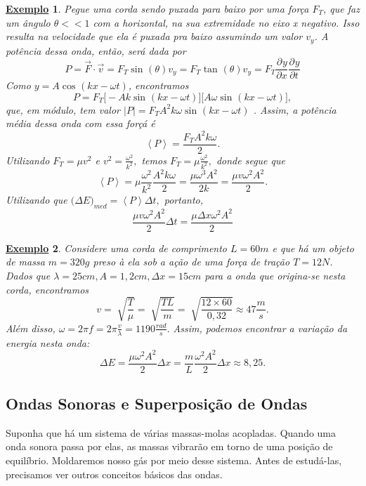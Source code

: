 \documentclass{article}
\newtheorem{example}{\underline{Exemplo}}
\begin{document}
\begin{example}
  Pegue uma corda sendo puxada para baixo por uma força \(F_{T}\), que faz um ângulo \(\theta << 1\) com a horizontal, na sua extremidade no eixo x negativo. Isso resulta
na velocidade que ela é puxada pra baixo assumindo um valor \(v_{y}\). A potência dessa onda, então, será dada por 
  \[
    P = \vec{F}\cdot \vec{v} = F_{T}\sin^{}{(\theta )}v_{y} = F_{T}\tan^{}{(\theta )}v_{y} = F_{T}\frac{\partial^{}y}{\partial x^{}}\frac{\partial^{}y}{\partial t^{}}
  \]
Como \(y = A\cos^{}{(kx - \omega t)}\), encontramos 
  \[
    P = F_{T}\biggl[-Ak\sin^{}{(kx - \omega t)}\biggr]\biggl[A\omega \sin^{}{(kx - \omega t)}\biggr],
  \]
que, em módulo, tem valor \(|P|=F_{T}A^{2}k\omega \sin^{}{(kx-\omega t)}\) . Assim, a potência média dessa onda com essa forçá é 
  \[
   \left< P \right> = \frac{F_{T}A^{2}k\omega }{2}.
  \]
  Utilizando \(F_{T} = \mu v^{2}\) e \(v^{2} = \frac{\omega ^{2}}{k^{2}},\) temos \(F_{T} = \mu \frac{\omega^{2}}{k^{2}},\) donde segue que
  \[
    \left< P \right> = \mu \frac{\omega^{2}}{k^{2}}\frac{A^{2}k\omega }{2} = \frac{\mu\omega^{3}A^{2}}{2k} = \frac{\mu v \omega^{2}A^{2}}{2}.
  \]
Utilizando que \(\biggl(\Delta E\biggr)_{med} = \left< P \right> \Delta t,\) portanto, 
  \[
    \frac{\mu v \omega ^{2}A^{2}}{2}\Delta t = \frac{\mu\Delta x\omega^{2}A^{2}}{2}
  \]
\end{example}
\begin{example}
  Considere uma corda de comprimento \(L = 60m\) e que há um objeto de massa \(m =320g\) preso à ela sob a ação de uma força de tração
 \(T = 12N\). Dados que \(\lambda = 25cm, A = 1,2cm, \Delta x = 15cm\) para a onda que origina-se nesta corda, encontramos 
   \[
     v = \sqrt[]{\frac{T}{\mu}} = \sqrt[]{\frac{TL}{m}} = \sqrt[]{\frac{12\times 60}{0,32}}\approx 47\frac{m}{s}.
   \]
  Além disso, \(\omega = 2\pi f = 2\pi \frac{v}{\lambda } = 1190\frac{rad}{s}.\) Assim, podemos encontrar a variação da energia nesta onda: 
  \[
    \Delta E = \frac{\mu\omega ^{2}A^{2}}{2}\Delta x = \frac{m}{L}\frac{\omega ^{2}A^{2}}{2}\Delta x\approx 8,25. 
  \]
\end{example}
\subsection{Ondas Sonoras e Superposição de Ondas}
  Suponha que há um sistema de várias massas-molas acopladas. Quando uma onda sonora passa por elas, as massas vibrarão em torno de uma posição de equilíbrio.
Moldaremos nosso gás por meio desse sistema. Antes de estudá-las, precisamos ver outros conceitos básicos das ondas.
  
\end{document}

